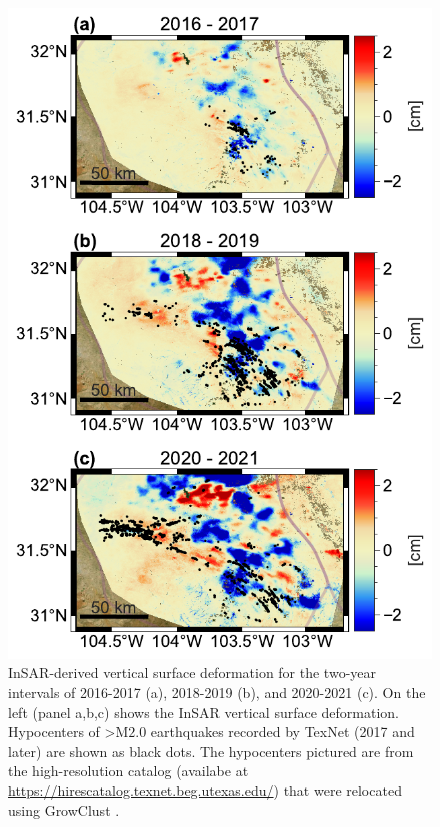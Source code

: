 \begin{figure}
	\centering
	\includegraphics[height=0.85\textheight]{figures/chapter5-lowess/figure-results-eqs.pdf}
	\caption[Incremental InSAR surface deformation and TexNet earthquake locations]{
		InSAR-derived vertical surface deformation for the two-year intervals of 2016-2017 (a), 2018-2019 (b), and 2020-2021 (c). On the left (panel a,b,c) shows the InSAR vertical surface deformation.
		Hypocenters of >M$2.0 $ earthquakes recorded by TexNet (2017 and later) are shown as black dots.
		The hypocenters pictured are from the high-resolution catalog (availabe at \url{https://hirescatalog.texnet.beg.utexas.edu/}) that were relocated using GrowClust \citep{Trugman2017GrowclustHierarchicalClustering}.
	}
	\label{fig:ch5-discuss-eqs}
\end{figure}


